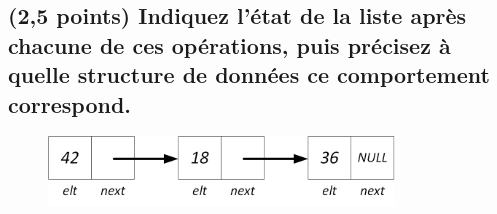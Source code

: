 \documentclass[11pt,a4paper]{article}
\begin{document}
\bigskip

\vfillLast

\newpage

\subsection{(2,5 points) Indiquez l'état de la liste après chacune de ces opérations, puis précisez à quelle structure de données ce comportement correspond. }


\begin{figure}[ht!]
\centering
\centerline{  %
\includegraphics[height=1.85cm]{img/Liste_p_1.png}
}
\end{figure}
\end{document}
